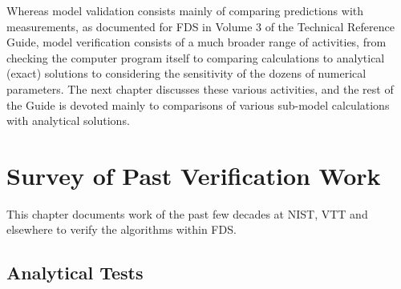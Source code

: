 \documentclass[11pt]{book}
\begin{document}
Whereas model validation consists mainly of comparing predictions with measurements, as documented for FDS in Volume 3 of the
Technical Reference Guide, model verification consists of a much broader range of activities, from checking the computer program
itself to comparing calculations to analytical (exact) solutions to considering the sensitivity of the dozens of numerical
parameters. The next chapter discusses these various activities, and the rest of the Guide is devoted mainly to comparisons of
various sub-model calculations with analytical solutions.








\chapter{Survey of Past Verification Work}

This chapter documents work of the past few decades at NIST, VTT and elsewhere to verify the algorithms within FDS.




\section{Analytical Tests}

\label{Analytical Tests}
\end{document}

